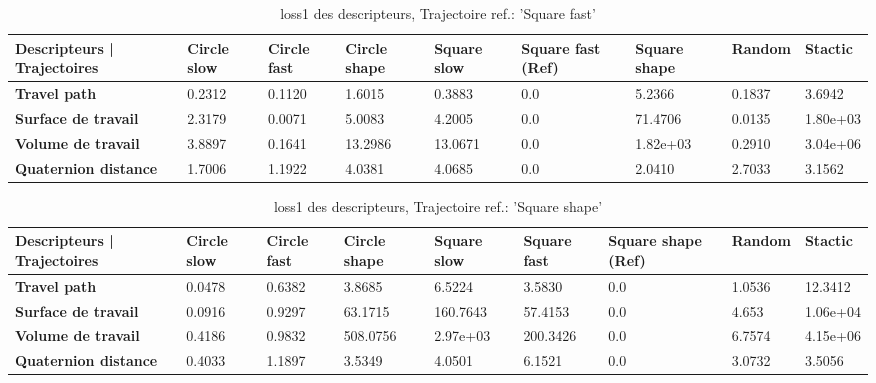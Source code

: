 \documentclass[8pt]{article}
\begin{document}
\begin{table}[H]
    \centering
    \begin{tabularx}{\textwidth}{|p{}|X|X|X|X|X|X|X|X|}
    \rowcolor{lightgray}
        \hline
        Descripteurs | Trajectoires &  Circle slow & Circle fast  &  Circle shape  & Square slow & \cellcolor[HTML]{238CCC} \textbf{Square fast (Ref)} & Square shape & Random & Stactic \\ \hline
        \textbf{Travel path} & 0.2312 & 0.1120 & 1.6015 & 0.3883 & 0.0 & 5.2366 & 0.1837 & 3.6942 \\ \hline
        \textbf{Surface de travail} & 2.3179 & 0.0071 & 5.0083 & 4.2005 & 0.0 & 71.4706 & 0.0135 & 1.80e+03 \\ \hline
        \textbf{Volume de travail} & 3.8897 & 0.1641 & 13.2986 & 13.0671 & 0.0 & 1.82e+03 & 0.2910 & 3.04e+06 \\ \hline
        \textbf{Quaternion distance} & 1.7006 & 1.1922 & 4.0381 & 4.0685 & 0.0 & 2.0410 & 2.7033 & 3.1562 \\ \hline  
    \end{tabularx}
    \caption{loss1 des descripteurs, Trajectoire ref.: 'Square fast'}
\end{table}

\begin{table}[H]
    \centering
    \begin{tabularx}{\textwidth}{|p{}|X|X|X|X|X|X|X|X|}
    \rowcolor{lightgray}
        \hline
        Descripteurs | Trajectoires &  Circle slow & Circle fast  &  Circle shape  & Square slow & Square fast & \cellcolor[HTML]{238CCC} \textbf{Square shape (Ref)} & Random & Stactic \\ \hline
        \textbf{Travel path} & 0.0478 & 0.6382 & 3.8685 & 6.5224 & 3.5830 & 0.0 & 1.0536 & 12.3412 \\ \hline
        \textbf{Surface de travail} & 0.0916 & 0.9297 & 63.1715 & 160.7643 & 57.4153 & 0.0 & 4.653 & 1.06e+04 \\ \hline
        \textbf{Volume de travail} & 0.4186 & 0.9832 & 508.0756 & 2.97e+03 & 200.3426 & 0.0 & 6.7574 & 4.15e+06 \\ \hline
        \textbf{Quaternion distance} & 0.4033 & 1.1897 & 3.5349 & 4.0501 & 6.1521 & 0.0 & 3.0732 & 3.5056 \\ \hline  
    \end{tabularx}
    \caption{loss1 des descripteurs, Trajectoire ref.: 'Square shape'}
\end{table}
\end{document}
